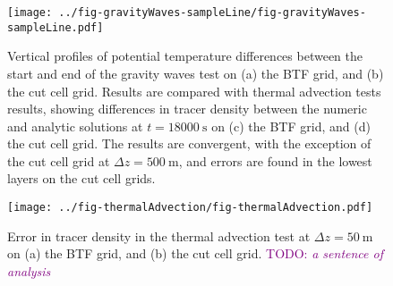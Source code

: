 \documentclass{ametsoc}
\newcommand{\TODO}[1]{\textcolor{purple}{TODO: \emph{#1}}}
\begin{document}
\begin{figure*}
	\centering
	\texttt{[image: ../fig-gravityWaves-sampleLine/fig-gravityWaves-sampleLine.pdf]}
%
	\caption{Vertical profiles of potential temperature differences between the start and end of the gravity waves test on (a) the BTF grid, and (b) the cut cell grid.  Results are compared with thermal advection tests results, showing differences in tracer density between the numeric and analytic solutions at $t = \SI{18000}{\second}$ on (c) the BTF grid, and (d) the cut cell grid.  The results are convergent, with the exception of the cut cell grid at $\Delta z = \SI{500}{\meter}$, and errors are found in the lowest layers on the cut cell grids.}
	\label{fig:gw-sampleLine}
\end{figure*}

\begin{figure}
	\centering
	\texttt{[image: ../fig-thermalAdvection/fig-thermalAdvection.pdf]}
%
	\caption{Error in tracer density in the thermal advection test at $\Delta z = \SI{50}{\meter}$ on (a) the BTF grid, and (b) the cut cell grid.  \TODO{a sentence of analysis}}
	\label{fig:thermalAdvection}
\end{figure}
\end{document}
